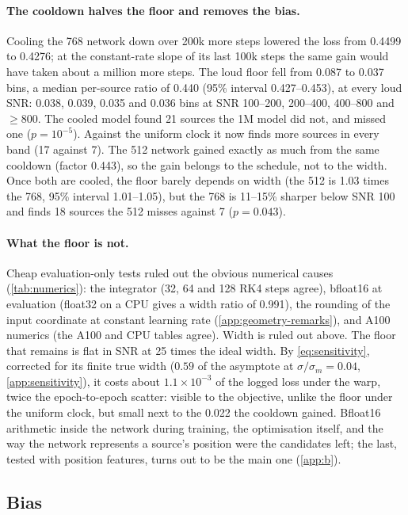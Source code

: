 \paragraph{The cooldown halves the floor and removes the bias.}
Cooling the 768 network down over 200k more steps lowered the loss from 0.4499 to 0.4276; at
the constant-rate slope of its last 100k steps the same gain would have taken about a million
more steps. The loud floor fell from 0.087 to 0.037 bins, a median per-source ratio of 0.440
(95\% interval 0.427--0.453), at every loud SNR: 0.038, 0.039, 0.035 and 0.036 bins at SNR
100--200, 200--400, 400--800 and $\ge800$. The cooled model found 21 sources the 1M model did
not, and missed one ($p=10^{-5}$). Against the uniform clock it now finds more sources in every
band (17 against 7). The 512 network gained exactly as much from the same cooldown (factor
0.443), so the gain belongs to the schedule, not to the width. Once both are cooled, the floor
barely depends on width (the 512 is 1.03 times the 768, 95\% interval 1.01--1.05), but the 768
is 11--15\% sharper below SNR 100 and finds 18 sources the 512 misses against 7 ($p=0.043$).

\paragraph{What the floor is not.}
Cheap evaluation-only tests ruled out the obvious numerical causes (\cref{tab:numerics}): the
integrator (32, 64 and 128 RK4 steps agree), bfloat16 at evaluation (float32 on a CPU gives a
width ratio of 0.991), the rounding of the input coordinate at constant learning rate
(\cref{app:geometry-remarks}), and A100 numerics (the A100 and CPU tables agree). Width is ruled
out above. The floor that remains is flat in SNR at 25 times the ideal width. By
\cref{eq:sensitivity}, corrected for its finite true width ($0.59$ of the asymptote at
$\sigma/\sigma_m=0.04$, \cref{app:sensitivity}), it costs about $1.1\times10^{-3}$ of the
logged loss under the warp, twice the epoch-to-epoch scatter: visible to the objective, unlike the floor under the uniform
clock, but small next to the 0.022 the cooldown gained. Bfloat16 arithmetic inside the network during training, the optimisation itself, and the way
the network represents a source's position were the candidates left; the last, tested with
position features, turns out to be the main one (\cref{app:b}).

\subsection{Bias}

